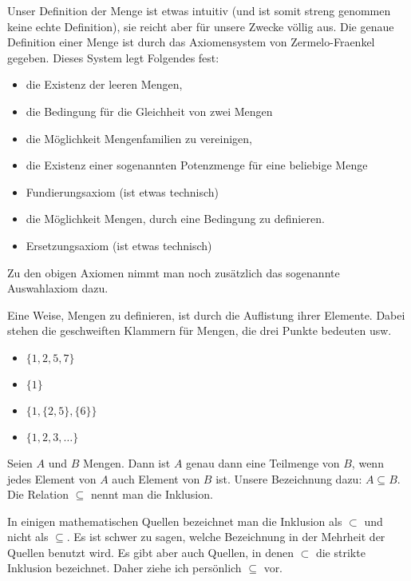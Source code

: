 \begin{bem}
	Unser Definition der Menge ist etwas intuitiv (und ist somit streng genommen keine echte Definition), sie reicht aber 	für unsere Zwecke völlig aus. Die genaue Definition einer Menge ist durch das Axiomensystem von Zermelo-Fraenkel gegeben. Dieses System legt Folgendes fest: 
	\begin{itemize}
		\item die Existenz der leeren Mengen, 
		\item die Bedingung für die Gleichheit von zwei Mengen
		\item die Möglichkeit Mengenfamilien zu vereinigen, 
		\item die Existenz einer sogenannten Potenzmenge für eine beliebige Menge
		\item Fundierungsaxiom (ist etwas technisch)
		\item die Möglichkeit Mengen, durch eine Bedingung zu definieren. 
		\item Ersetzungsaxiom (ist etwas technisch)
	\end{itemize} 
	Zu den obigen Axiomen nimmt man noch zusätzlich das sogenannte Auswahlaxiom dazu. 
\end{bem} 


\begin{bem} 
Eine Weise, Mengen zu definieren, ist durch die Auflistung ihrer Elemente. Dabei stehen die geschweiften Klammern für Mengen, die drei Punkte bedeuten \glqq usw\grqq.
\begin{itemize}
	\item $ \{1,2,5,7\} $
	\item $ \{1\} $
	\item $ \{1,\{2,5\},\{6\}\} $
	\item $ \{1,2,3,\ldots\} $
\end{itemize}
\end{bem}

\begin{defn}
Seien $ A $ und $ B $ Mengen. Dann ist $ A $ genau dann eine Teilmenge von $ B $, wenn jedes Element von $ A $ auch Element von $ B $ ist. Unsere Bezeichnung dazu: $A \subseteq B$. Die Relation $\subseteq$ nennt man die Inklusion. 
\end{defn}

\begin{bem}
In einigen mathematischen Quellen bezeichnet man die Inklusion als $ \subset $ und nicht als $ \subseteq $. Es ist schwer zu sagen, welche Bezeichnung in der Mehrheit der Quellen benutzt wird. Es gibt aber auch Quellen, in denen $ \subset $ die strikte Inklusion bezeichnet. Daher ziehe ich persönlich $ \subseteq $ vor.
\end{bem} 

